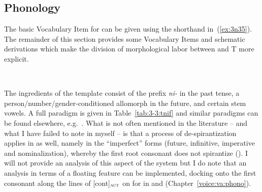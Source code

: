 \begin{exe}
\begin{xlist}
\begin{xlist}
\begin{exe}
\begin{xlist}
\begin{xlist}
\begin{exe}
\begin{xlist}
\begin{xlist}
\begin{exe}
\begin{exe}
\begin{xlist}
\begin{exe}
\begin{exe}
\begin{xlist}
\begin{exe}
\begin{exe}
\begin{exe}
\begin{exe}
\begin{exe}
\begin{xlist}
\begin{exe}
\begin{xlist}
\begin{exe}
\begin{exe}
\begin{xlist}
\begin{exe}
\begin{xlist}
\begin{exe}
\begin{xlist}
\begin{exe}
\begin{exe}
\begin{exe}
\begin{xlist}
\begin{exe}
\begin{exe}
\begin{exe}
\begin{xlist}
\begin{exe}
\begin{xlist}
\begin{exe}
\begin{xlist}
\begin{exe}
\begin{xlist}
\begin{exe}
\begin{exe}
	\subsection{Phonology} \label{vz:vz:phono}
The basic Vocabulary Item for {\vz} can be given using the shorthand in~(\ref{ex:3n35}). The remainder of this section provides some Vocabulary Items and schematic derivations which make the division of morphological labor between {\vz} and T more explicit.
 \begin{exe}
\ex  \label{ex:3n35}{\vz} \lra~{\tnif} 
 \z 

\label{r1:3:3}The ingredients of the template {\tnif} consist of the prefix \emph{ni-} in the past tense, a person/number/gender-conditioned allomorph in the future, and certain stem vowels. A full paradigm is given in Table~\ref{tab:3-3:tnif} and similar paradigms can be found elsewhere, e.g.~\cite{schwarzwald08}. What is not often mentioned in the literature -- and what I have failed to note in \cite{kastner18nllt} myself -- is that a process of de-spirantization applies in {\tnif} as well, namely in the ``imperfect'' forms (future, infinitive, imperative and nominalization), whereby the first root consonant does not spirantize (). I will not provide an analysis of this aspect of the system but I do note that an analysis in terms of a floating feature can be implemented, docking onto the first consonant along the lines of [\textminus{}cont]$_{\text{\gsc{ACT}}}$ on  for {\va} in {\tpie} and {\thit} (Chapter~\ref{voice:va:phono}).


\end{exe}
\end{exe}
\end{exe}
\end{xlist}
\end{exe}
\end{xlist}
\end{exe}
\end{xlist}
\end{exe}
\end{xlist}
\end{exe}
\end{exe}
\end{exe}
\end{xlist}
\end{exe}
\end{exe}
\end{exe}
\end{xlist}
\end{exe}
\end{xlist}
\end{exe}
\end{xlist}
\end{exe}
\end{exe}
\end{xlist}
\end{exe}
\end{xlist}
\end{exe}
\end{exe}
\end{exe}
\end{exe}
\end{exe}
\end{xlist}
\end{exe}
\end{exe}
\end{xlist}
\end{exe}
\end{exe}
\end{xlist}
\end{xlist}
\end{exe}
\end{xlist}
\end{xlist}
\end{exe}
\end{xlist}
\end{xlist}
\end{exe}
